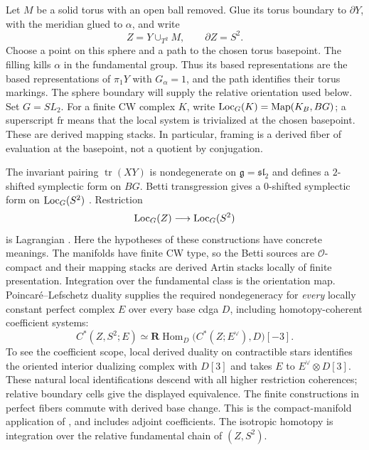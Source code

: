 Let \(M\) be a solid torus with an open ball removed.  Glue its torus boundary
to \(\partial Y\), with the meridian glued to \(\alpha\), and write
\[
                   Z=Y\cup_{T^2}M,\qquad \partial Z=S^2.
\]
Choose a point on this sphere and a path to the chosen torus basepoint.
The filling kills \(\alpha\) in the fundamental group.  Thus its based
representations are the based representations of \(\pi_1Y\) with
\(G_\alpha=1\), and the path identifies their torus markings.
The sphere boundary will supply the relative orientation used below.
Set \(G=SL_2\).  For a finite CW complex \(K\), write
\(\operatorname{Loc}_G(K)=\operatorname{Map}(K_B,BG)\); a superscript \(\mathrm{fr}\)
means that the local system is trivialized at the chosen basepoint.
These are derived mapping stacks.  In particular, framing is a derived
fiber of evaluation at the basepoint, not a quotient by conjugation.

The invariant pairing \(\operatorname{tr}(XY)\) is nondegenerate on
\(\mathfrak g=\mathfrak{sl}_2\) and defines a \(2\)-shifted symplectic form
on \(BG\).  Betti transgression gives a \(0\)-shifted symplectic form on
\(\operatorname{Loc}_G(S^2)\) \cite[Theorem~2.5 and Corollary~2.6(4)]{PTVV2013}.
Restriction
\[
                     \operatorname{Loc}_G(Z)\longrightarrow\operatorname{Loc}_G(S^2)
\]
is Lagrangian \cite[Definition~2.6, Claim~2.7, and Theorem~2.9]{Calaque2015}.
Here the hypotheses of these constructions have concrete meanings.
The manifolds have finite CW type, so the Betti sources are
\(\mathcal O\)-compact and their mapping stacks are derived Artin stacks
locally of finite presentation.  Integration over the fundamental class
is the orientation map.  Poincar\'e--Lefschetz duality supplies the required nondegeneracy for
\emph{every} locally constant perfect complex \(E\) over every base
cdga \(D\), including homotopy-coherent coefficient systems:
\[
 C^*(Z,S^2;E)\simeq
 \mathbf R\!\operatorname{Hom}_D\bigl(C^*(Z;E^\vee),D\bigr)[-3].
\]
To see the coefficient scope, local derived duality on contractible
stars identifies the oriented interior dualizing complex with \(D[3]\)
and takes \(E\) to \(E^\vee\otimes D[3]\).  These natural local
identifications descend with all higher restriction coherences;
relative boundary cells give the displayed equivalence.  The finite
constructions in perfect fibers commute with derived base change.
This is the compact-manifold application of
\cite[\S\S3.1.1--3.1.2]{Calaque2015}, and includes adjoint coefficients.
The isotropic homotopy is integration over the relative fundamental chain
of \((Z,S^2)\).

